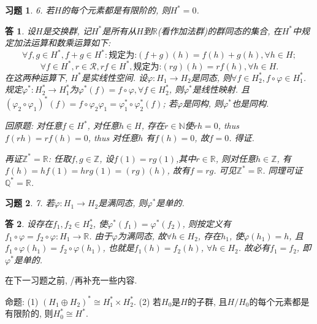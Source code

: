 \documentclass{ctexart}%
\newtheorem*{exercise}{习题}
\newtheorem*{solution}{答}
\theoremstyle{definition}
\theoremstyle{remark}
\begin{document}
\begin{exercise}6. 若$H$的每个元素都是有限阶的, 则$H^*=0$.
\end{exercise}
\begin{solution}
设$H$是交换群, 记$H^*$是所有从$H$到$\mathbb{R}$(看作加法群)的群同态的集合, 在$H^*$中规定加法运算和数乘运算如下:
$$\forall f,g\in H^*, f+g\in H^*: \text{规定为:} (f+g)(h)=f(h)+g(h),\forall h\in H;$$
$$\forall f\in H^*, r\in \mathcal{R}, rf\in H^*, \text{规定为:} (rg)(h)=rf(h), \forall h\in H.$$
在这两种运算下, $H^*$是实线性空间. 设$\varphi: H_1\rightarrow H_2$是同态, 则$\forall f\in H^*_2, f\circ \varphi \in H^*_1$. 规定$\varphi^*: H^*_2\rightarrow H^*_1$为$\varphi^*(f)=f\circ\varphi,\forall f\in H^*_2$, 则$\varphi^*$是线性映射. 且$(\varphi_2\circ \varphi_1)^*(f)=f\circ\varphi_2\varphi_1=\varphi_1^*\circ\varphi^*_2(f)$; 若$\varphi$是同构, 则$\varphi^*$也是同构. 

回原题: 对任意$f\in H^*$, 对任意$h\in H$, 存在$r\in \mathbb{N}$使$rh=0$, thus $f(rh)=rf(h)=0$, thus 对任意$h$ 有$f(h)=0$, 故$f=0$. 得证.

再证$\mathbb{Z}^*=\mathbb{R}$: 任取$f,g\in \mathbb{Z}$, 设$f(1)=rg(1)$,其中$r\in \mathbb{R}$, 则对任意$h\in \mathbb{Z}$, 有$f(h)=hf(1)=hrg(1)=(rg)(h)$, 故有$f=rg$. 可见$\mathbb{Z}^*=\mathbb{R}$. 同理可证$\mathbb{Q}^*=\mathbb{R}$. 
\end{solution}

\begin{exercise}7. 若$\varphi:H_1\rightarrow H_2$是满同态, 则$\varphi^*$是单的.
\end{exercise}
\begin{solution}
设存在$f_1,f_2\in H^*_2$, 使$\varphi^*(f_1)=\varphi^*(f_2)$, 则按定义有$f_1\circ\varphi=f_2\circ\varphi: H_1\rightarrow \mathbb{R}$. 由于$\varphi$为满同态, 故$\forall h\in H_2$, 存在$h_1$, 使$\varphi(h_1)=h$, 且$f_1\circ\varphi (h_1)=f_2\circ\varphi(h_1)$, 也就是$f_1(h)=f_2(h)$, $\forall h\in H_2$. 故必有$f_1=f_2$, 即$\varphi^*$是单的.
\end{solution}

在下一习题之前, /再补充一些内容.

命题: (1) $(H_1\oplus H_2)^* \cong H^*_1\times H^*_2$. (2) 若$H_0$是$H$的子群, 且$H/H_0$的每个元素都是有限阶的, 则$H^*_0\cong H^*$.
\end{document}
